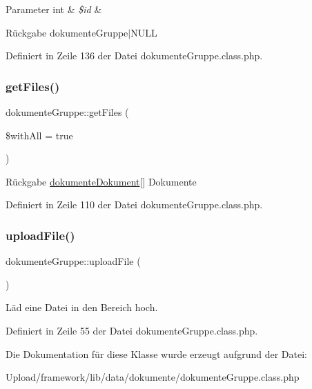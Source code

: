 \begin{DoxyParams}[1]{Parameter}
int & {\em \$id} & \\
\hline
\end{DoxyParams}
\begin{DoxyReturn}{Rückgabe}
dokumente\+Gruppe$\vert$\+N\+U\+LL 
\end{DoxyReturn}


Definiert in Zeile 136 der Datei dokumente\+Gruppe.\+class.\+php.

\mbox{\label{classdokumente_gruppe_a09c395452998f8062e8bb92d2b1a965e}} 
\subsubsection{\texorpdfstring{get\+Files()}{getFiles()}}
{\footnotesize\ttfamily dokumente\+Gruppe\+::get\+Files (\begin{DoxyParamCaption}\item[{}]{\$with\+All = {\ttfamily true} }\end{DoxyParamCaption})}

\begin{DoxyReturn}{Rückgabe}
\mbox{\hyperlink{classdokumente_dokument}{dokumente\+Dokument}}\mbox{[}\mbox{]} Dokumente 
\end{DoxyReturn}


Definiert in Zeile 110 der Datei dokumente\+Gruppe.\+class.\+php.

\mbox{\label{classdokumente_gruppe_a731a1cf436e614b6e3f0ccd94a188035}} 
\subsubsection{\texorpdfstring{upload\+File()}{uploadFile()}}
{\footnotesize\ttfamily dokumente\+Gruppe\+::upload\+File (\begin{DoxyParamCaption}{ }\end{DoxyParamCaption})}

Läd eine Datei in den Bereich hoch. 

Definiert in Zeile 55 der Datei dokumente\+Gruppe.\+class.\+php.



Die Dokumentation für diese Klasse wurde erzeugt aufgrund der Datei\+:\begin{DoxyCompactItemize}
\item 
Upload/framework/lib/data/dokumente/dokumente\+Gruppe.\+class.\+php\end{DoxyCompactItemize}
